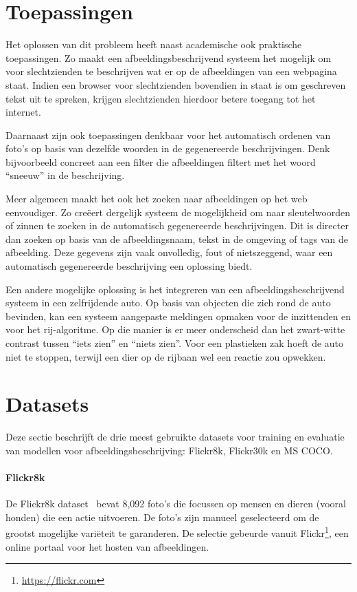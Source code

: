 \section{Toepassingen}
Het oplossen van dit probleem heeft naast academische ook praktische toepassingen. Zo maakt een afbeeldingsbeschrijvend systeem het mogelijk om voor slechtzienden te beschrijven wat er op de afbeeldingen van een webpagina staat. Indien een browser voor slechtzienden bovendien in staat is om geschreven tekst uit te spreken, krijgen slechtzienden hierdoor betere toegang tot het internet.

Daarnaast zijn ook toepassingen denkbaar voor het automatisch ordenen van foto's op basis van dezelfde woorden in de gegenereerde beschrijvingen. Denk bijvoorbeeld concreet aan een filter die afbeeldingen filtert met het woord ``sneeuw'' in de beschrijving. 

Meer algemeen maakt het ook het zoeken naar afbeeldingen op het web eenvoudiger. Zo cre\"eert dergelijk systeem de mogelijkheid om naar sleutelwoorden of zinnen te zoeken in de automatisch gegenereerde beschrijvingen. Dit is directer dan zoeken op basis van de afbeeldingsnaam, tekst in de omgeving of tags van de afbeelding. Deze gegevens zijn vaak onvolledig, fout of nietszeggend, waar een automatisch gegenereerde beschrijving een oplossing biedt.

Een andere mogelijke oplossing is het integreren van een afbeeldingsbeschrijvend systeem in een zelfrijdende auto. Op basis van objecten die zich rond de auto bevinden, kan een systeem aangepaste meldingen opmaken voor de inzittenden en voor het rij-algoritme. Op die manier is er meer onderscheid dan het zwart-witte contrast tussen ``iets zien'' en ``niets zien''. Voor een plastieken zak hoeft de auto niet te stoppen, terwijl een dier op de rijbaan wel een reactie zou opwekken.


\section{Datasets}
\label{sec:Datasets}
Deze sectie beschrijft de drie meest gebruikte datasets voor training en evaluatie van modellen voor afbeeldingsbeschrijving: Flickr8k, Flickr30k en MS COCO.

\paragraph{Flickr8k}
\label{par:Flickr8k}
De Flickr8k dataset~\cite{Hodosh2013} bevat 8,092 foto's die focussen op mensen en dieren (vooral honden) die een actie uitvoeren. De foto's zijn manueel geselecteerd om de grootst mogelijke vari\"eteit te garanderen. De selectie gebeurde vanuit Flickr\footnote{\url{https://flickr.com}}, een online portaal voor het hosten van afbeeldingen.

